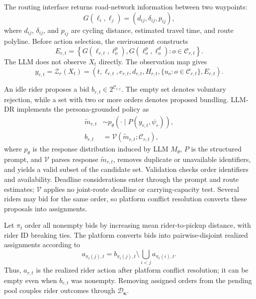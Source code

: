 \documentclass[letterpaper,journal]{IEEEtran}
\begin{document}
The routing interface returns road-network information between two waypoints:
\begin{equation}
G(\ell_i,\ell_j)=(d_{ij},\delta_{ij},p_{ij}),
\end{equation}
where $d_{ij}$, $\delta_{ij}$, and $p_{ij}$ are cycling distance, estimated travel time, and route polyline. Before action selection, the environment constructs
\begin{equation}
E_{r,t}=\left\{
G(\ell_{r,t},\ell_o^p),G(\ell_o^p,\ell_o^d)
:o\in\mathcal{C}_{r,t}\right\}.
\end{equation}
The LLM does not observe $X_t$ directly. The observation map gives
\begin{equation}
y_{r,t}=\mathcal{Z}_r(X_t)=\left(t,\ell_{r,t},e_{r,t},d_{r,t},H_{r,t},
\{u_o:o\in\mathcal{C}_{r,t}\},E_{r,t}\right).
\end{equation}

An idle rider proposes a bid $b_{r,t}\in2^{\mathcal{C}_{r,t}}$. The empty set denotes voluntary rejection, while a set with two or more orders denotes proposed bundling. LLM-DR implements the persona-grounded policy as
\begin{align}
\widetilde m_{r,t}&\sim
p_{\theta}\!\left(\cdot\mid P(y_{r,t},\psi_r)\right),\\
b_{r,t}&=\mathcal{V}(\widetilde m_{r,t};\mathcal{C}_{r,t}),
\end{align}
where $p_{\theta}$ is the response distribution induced by LLM $M_{\theta}$, $P$ is the structured prompt, and $\mathcal{V}$ parses response $\widetilde m_{r,t}$, removes duplicate or unavailable identifiers, and yields a valid subset of the candidate set. Validation checks order identifiers and availability. Deadline considerations enter through the prompt and route estimates; $\mathcal{V}$ applies no joint-route deadline or carrying-capacity test. Several riders may bid for the same order, so platform conflict resolution converts these proposals into assignments.

Let $\pi_t$ order all nonempty bids by increasing mean rider-to-pickup distance, with rider ID breaking ties. The platform converts bids into pairwise-disjoint realized assignments according to
\begin{equation}
a_{\pi_t(j),t}=b_{\pi_t(j),t}\setminus
\bigcup_{i<j}a_{\pi_t(i),t}.
\end{equation}
Thus, $a_{r,t}$ is the realized rider action after platform conflict resolution; it can be empty even when $b_{r,t}$ was nonempty. Removing assigned orders from the pending pool couples rider outcomes through $\mathcal{D}_{\boldsymbol{\kappa}}$.
\end{document}
